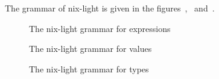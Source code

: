 The grammar of nix-light is given in the
figures~,~
and~.

\begin{figure}
  
  \caption{\label{grammar::expressions}The nix-light grammar for expressions}
\end{figure}

\begin{figure}
  
  \caption{\label{grammar::values}The nix-light grammar for values}
\end{figure}

\begin{figure}
  
  \caption{\label{grammar::types}The nix-light grammar for types}
\end{figure}
